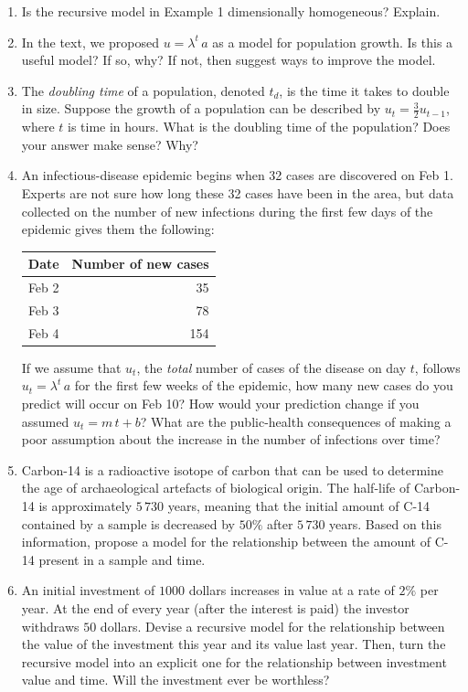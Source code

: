 \documentclass[11pt]{article}
\begin{document}
\begin{enumerate}
\begin{enumerate}
      \item Is the recursive model in Example 1 dimensionally homogeneous? Explain.
      \item In the text, we proposed $u = \lambda^t\, a$ as a model for population growth. Is this a useful model? If so, why? If not, then suggest ways to improve the model.
      \item The {\it doubling time} of a population, denoted $t_d$, is the time it takes to double in size. Suppose the growth of a population can be described by $u_t = \frac{3}{2} u_{t-1}$, where $t$ is time in hours. What is the doubling time of the population? Does your answer make sense? Why?
      \item An infectious-disease epidemic begins when 32 cases are discovered on Feb 1. Experts are not sure how long these 32 cases have been in the area, but data collected on the number of new infections during the first few days of the epidemic gives them the following: 
        \begin{center}
          \begin{tabular}{c|r}
            Date & Number of new cases \\
            \midrule
            Feb 2 & 35 \\
            Feb 3 & 78 \\
            Feb 4 & 154 
          \end{tabular}
        \end{center}
        If we assume that $u_t$, the {\it total} number of cases of the disease on day $t$, follows $u_t = \lambda^t \, a$ for the first few weeks of the epidemic, how many new cases do you predict will occur on Feb 10? How would your prediction change if you assumed $u_t = m \, t + b$? What are the public-health consequences of making a poor assumption about the increase in the number of infections over time? 
      \item Carbon-14 is a radioactive isotope of carbon that can be used to determine the age of archaeological artefacts of biological origin. The half-life of Carbon-14 is approximately $5\, 730$ years, meaning that the initial amount of C-14 contained by a sample is decreased by $50\%$ after $5\, 730$ years. Based on this information, propose a model for the relationship between the amount of C-14 present in a sample and time.  
      \item An initial investment of $1000$ dollars increases in value at a rate of $2\%$ per year. At the end of every year (after the interest is paid) the investor withdraws $50$ dollars. Devise a recursive model for the relationship between the value of the investment this year and its value last year. Then, turn the recursive model into an explicit one for the relationship between investment value and time. Will the investment ever be worthless? 
    \end{enumerate}


\end{enumerate}
\end{document}
